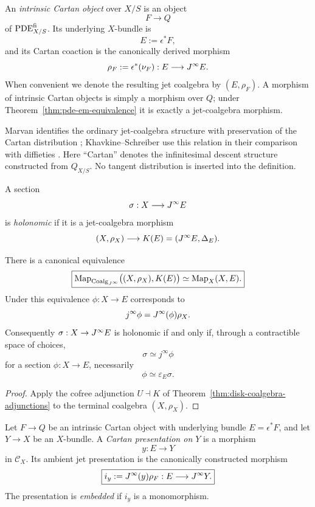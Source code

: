 \begin{definition}
\label{def:coalgebraic-cartan}
An \emph{intrinsic Cartan object} over $X/S$ is an object
\[
    F\longrightarrow Q
\]
of $\operatorname{PDE}^{\mathrm{fi}}_{X/S}$.  Its underlying $X$-bundle is
\[
    E:=\epsilon^*F,
\]
and its Cartan coaction is the canonically derived morphism
\[
    \rho_F:=\epsilon^*(\nu_F):E\longrightarrow J^{\infty} E.
\]
When convenient we denote the resulting jet coalgebra by $(E,\rho_F)$.  A morphism of intrinsic Cartan objects is simply a morphism over $Q$; under Theorem~\ref{thm:pde-em-equivalence} it is exactly a jet-coalgebra morphism.
\end{definition}

\begin{remark}
Marvan identifies the ordinary jet-coalgebra structure with preservation of the Cartan distribution \cite{Marvan1986}; Khavkine--Schreiber use this relation in their comparison with diffieties \cite{KhavkineSchreiber2017}.  Here ``Cartan'' denotes the infinitesimal descent structure constructed from $Q_{X/S}$.  No tangent distribution is inserted into the definition.
\end{remark}

\begin{definition}
\label{def:holonomic-section}
A section
\[
    \sigma:X\longrightarrow J^{\infty} E
\]
is \emph{holonomic} if it is a jet-coalgebra morphism
\[
    (X,\rho_X)\longrightarrow K(E)=(J^{\infty} E,\Delta_E).
\]
\end{definition}

\begin{theorem}
\label{thm:holonomic-recognition}
There is a canonical equivalence
\[
\boxed{
    \operatorname{Map}_{\operatorname{Coalg}_{J^{\infty}}}
    \bigl((X,\rho_X),K(E)\bigr)
    \simeq
    \operatorname{Map}_X(X,E).
}
\]
Under this equivalence $\phi:X\to E$ corresponds to
\[
    j^\infty\phi=J^{\infty}(\phi)\rho_X.
\]
Consequently $\sigma:X\to J^{\infty} E$ is holonomic if and only if, through a contractible space of choices,
\[
    \sigma\simeq j^\infty\phi
\]
for a section $\phi:X\to E$, necessarily
\[
    \phi\simeq\varepsilon_E\sigma.
\]
\end{theorem}

\begin{proof}
Apply the cofree adjunction $U\dashv K$ of Theorem~\ref{thm:disk-coalgebra-adjunctions} to the terminal coalgebra $(X,\rho_X)$.
\end{proof}

\begin{definition}
\label{def:cartan-presentation}
Let $F\to Q$ be an intrinsic Cartan object with underlying bundle $E=\epsilon^*F$, and let $Y\to X$ be an $X$-bundle.  A \emph{Cartan presentation on $Y$} is a morphism
\[
    y:E\longrightarrow Y
\]
in $\mathcal C_X$.  Its ambient jet presentation is the canonically constructed morphism
\[
    \boxed{
    i_y:=J^{\infty}(y)\rho_F:E\longrightarrow J^{\infty} Y.
    }
\]
The presentation is \emph{embedded} if $i_y$ is a monomorphism.
\end{definition}

